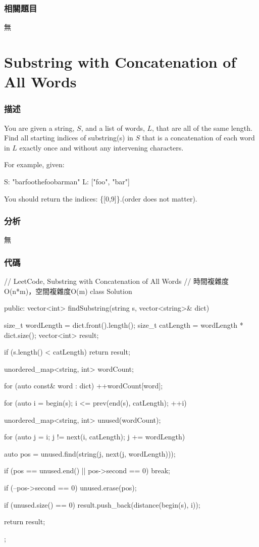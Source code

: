 \subsubsection{相關題目}

\begindot
\item 無
\myenddot


\section{Substring with Concatenation of All Words} %
\label{sec:substring-with-concatenation-of-all-words}


\subsubsection{描述}
You are given a string, $S$, and a list of words, $L$, that are all of the same length. Find all starting indices of substring(s) in $S$ that is a concatenation of each word in $L$ exactly once and without any intervening characters.

For example, given: 
\begin{Code}
S: "barfoothefoobarman"
L: ["foo", "bar"]
\end{Code}

You should return the indices: \code\{[0,9]\}.(order does not matter).


\subsubsection{分析}
無


\subsubsection{代碼}
\begin{Code}
// LeetCode, Substring with Concatenation of All Words
// 時間複雜度O(n*m)，空間複雜度O(m)
class Solution {
public:
    vector<int> findSubstring(string s, vector<string>& dict) {
        size_t wordLength = dict.front().length();
        size_t catLength = wordLength * dict.size();
        vector<int> result;

        if (s.length() < catLength) return result;

        unordered_map<string, int> wordCount;

        for (auto const& word : dict) ++wordCount[word];

        for (auto i = begin(s); i <= prev(end(s), catLength); ++i) {
            unordered_map<string, int> unused(wordCount);

            for (auto j = i; j != next(i, catLength); j += wordLength) {
                auto pos = unused.find(string(j, next(j, wordLength)));

                if (pos == unused.end() || pos->second == 0) break;

                if (--pos->second == 0) unused.erase(pos);
            }

            if (unused.size() == 0) result.push_back(distance(begin(s), i));
        }

        return result;
    }
};
\end{Code}


